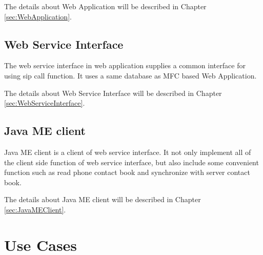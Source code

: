 The details about Web Application will be described in Chapter \ref{sec:WebApplication}.

\subsection{Web Service Interface}

The web service interface in web application supplies a common interface for using sip call function. It uses a same database as MFC based Web Application.

The details about Web Service Interface will be described in Chapter \ref{sec:WebServiceInterface}.

\subsection{Java ME client}

Java ME client is a client of web service interface. It not only implement all of the client side function of web service interface, but also include some convenient function such as read phone contact book and synchronize with server contact book.

The details about Java ME client will be described in Chapter \ref{sec:JavaMEClient}.


\section{Use Cases}




